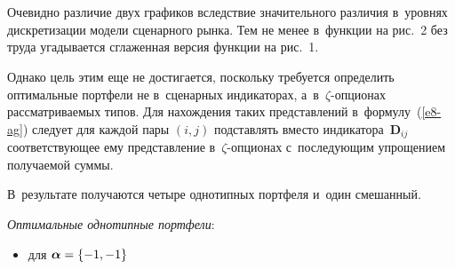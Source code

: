 \begin{multicols}{2}
\begin{figure*} %
\vspace*{1pt}
\begin{minipage}[t]{80mm}
  \begin{center}  
    \mbox{%
\epsfxsize=72.063mm
}
\end{center}
\vspace*{-11pt}
\end{minipage}
\hfill
\vspace*{1pt}
\begin{minipage}[t]{80mm}
  \begin{center}  
    \mbox{%
\epsfxsize=72.063mm
}
\end{center}
\vspace*{-11pt}
\end{minipage}
\vspace*{12pt}
\end{figure*}
  
  Очевидно различие двух графиков вследствие значительного различия 
в~уровнях дискретизации модели сценарного рынка. Тем не менее в~функции 
на рис.~2 без труда угадывается сглаженная версия функции на рис.~1. 

  
  Однако цель этим еще не достигается, поскольку требуется определить 
оптимальные портфели не в~сценарных индикаторах, а~в~$\zeta$-оп\-ци\-о\-нах 
рас\-смат\-ри\-ва\-емых типов. Для нахождения таких пред\-став\-ле\-ний 
в~формулу~(\ref{e8-ag}) следует для каждой пары $(i, j)$ под\-став\-лять вместо 
индикатора~$\boldsymbol{D}_{ij}$ со\-от\-вет\-ст\-ву\-ющее ему представление 
в~$\zeta$-оп\-ци\-о\-нах с~по\-сле\-ду\-ющим упрощением получаемой суммы.

 В~результате 
получаются четыре однотипных портфеля и~один смешанный. 
  
  \textit{Оптимальные однотипные портфели}: 
\begin{itemize}
\item   
для $\boldsymbol{\alpha}\hm= \{-1,-1\}$

  \vspace*{-6pt}


\end{itemize}
\end{multicols}

